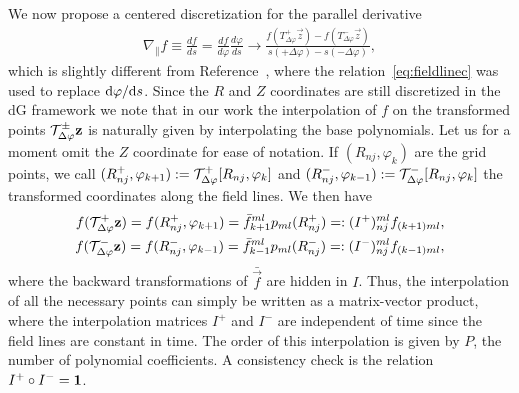 We now propose a centered discretization for the parallel derivative
\begin{align}
    \nabla_\parallel f \equiv \frac{df}{ds} = \frac{df}{d\varphi}\frac{d\varphi}{ds}
    \rightarrow \frac{f\left(T_{\Delta\varphi}^+\vec z\right)-f\left(T_{\Delta\varphi}^-\vec z\right)}{s(+\Delta\varphi) - s(-\Delta\varphi)},
    \label{eq:paralleldis}
\end{align}
which is slightly different from Reference~\cite{Hariri2014}, where
the relation~\eqref{eq:fieldlinec} was used to replace $\mathrm{d} \varphi/\mathrm{d} s$.
Since the $R$ and $Z$ coordinates are still discretized in the dG framework we note that in our work
the interpolation of $f$ on the transformed points $\mathcal T^\pm_{\Delta\varphi}{\mathbf{z}}$
is naturally given by interpolating the base polynomials.
Let us for a moment omit the $Z$ coordinate for ease of notation.
If $(R_{nj}, \varphi_k)$ are the grid points,
we call $(R^+_{nj}, \varphi_{k+1}) := \mathcal T^+_{\Delta\varphi}[R_{nj}, \varphi_k]$ and
$(R_{nj}^-, \varphi_{k-1}) := \mathcal T^-_{\Delta\varphi}[R_{nj}, \varphi_k]$ the transformed coordinates along
the field lines. We then have
\begin{subequations}
\begin{align}
    f(\mathcal T^+_{\Delta\varphi}{\mathbf{z}}) = f( R^+_{nj}, \varphi_{k+1}) = \bar f_{k+1}^{ml}p_{ml}(R^+_{nj}) =: (I^+)_{nj}^{ml}f_{(k+1)ml} , \\
    f(\mathcal T^-_{\Delta\varphi}{\mathbf{z}}) = f( R^-_{nj}, \varphi_{k-1}) = \bar f_{k-1}^{ml}p_{ml}(R^-_{nj}) =: (I^-)_{nj}^{ml}f_{(k-1)ml} , 
\end{align}
\label{eq:interpolation}
\end{subequations}
where the backward transformations of $\bar{ \vec f}$ are hidden in $I$.
Thus, the interpolation of all the necessary points can simply be written as a matrix-vector product, where the interpolation matrices $I^+$  and $I^-$ are independent of time since
the field lines are constant in time. The order of this interpolation is given by $P$, the number of polynomial coefficients.
A consistency check is the relation $I^+\circ I^- = \mathbf{1}$. 

